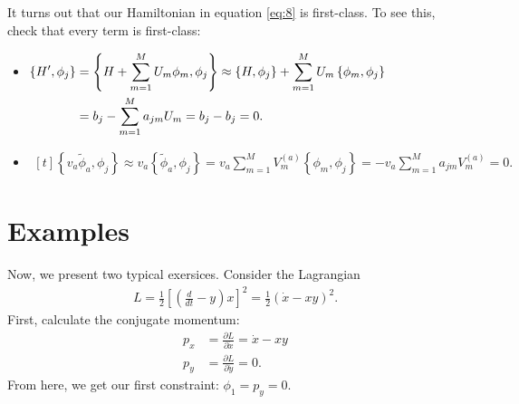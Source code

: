 It turns out that our Hamiltonian in equation \eqref{eq:8} is first-class. To see this, check that every term is first-class:
\begin{itemize}
\item \(
\begin{aligned}[t]
\left \{ H',\phi_j \right \} &= \left \{ H + \sum_{m=1}^M U_m \phi_m ,\phi_j \right \} \approx  \left \{ H ,\phi_j \right \} + \sum_{m=1}^M U_m \left \{ \phi_m ,\phi_j \right \} \notag \\
&= b_j - \sum_{m=1}^M a_{jm} U_m = b_j - b_j = 0.
\end{aligned} \)
\item \(
\begin{aligned}[t]
\left \{ v_a \tilde{\phi}_a,\phi_j \right \} \approx v_a \left \{\tilde{\phi}_a,\phi_j \right \} = v_a \sum_{m=1}^M V_m^{(a)} \left \{ \phi_m ,\phi_j \right \} = - v_a \sum_{m=1}^M a_{jm} V_m^{(a)} = 0.
\end{aligned} \)
\end{itemize}


\section{Examples}

Now, we present two typical exersices. Consider the Lagrangian
\begin{align}
L = \frac{1}{2} \left[ \left( \frac{d}{dt} - y \right) x \right]^2 = \frac{1}{2} \left(\dot{x} - xy \right)^2.
\end{align}
First, calculate the conjugate momentum:
\begin{align}
p_x &= \frac{\partial L}{\partial \dot{x}} = \dot{x} - xy \\
p_y &= \frac{\partial L}{\partial \dot{y}} = 0.
\end{align}
From here, we get our first constraint: $\phi_1 = p_y = 0$. \\

